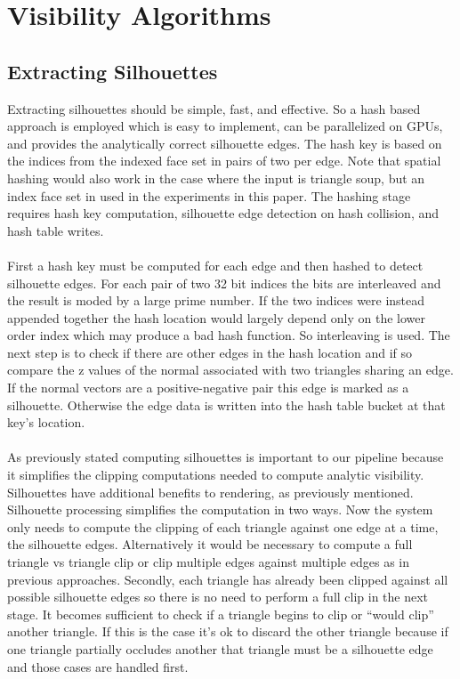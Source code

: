 \documentclass[review]{acmsiggraph}
\begin{document}
\section{Visibility Algorithms}
\subsection{Extracting Silhouettes}
Extracting silhouettes should be simple, fast, and effective. So a hash based approach is employed which is easy to implement, can be parallelized on GPUs, and provides the analytically correct silhouette edges. The hash key is based on the indices from the indexed face set in pairs of two per edge. Note that spatial hashing would also work in the case where the input is triangle soup, but an index face set in used in the experiments in this paper. The hashing stage requires hash key computation, silhouette edge detection on hash collision, and hash table writes.
\\\\
First a hash key must be computed for each edge and then hashed to detect silhouette edges. For each pair of two 32 bit indices the bits are interleaved and the result is moded by a large prime number. If the two indices were instead appended together the hash location would largely depend only on the lower order index which may produce a bad hash function. So interleaving is used. The next step is to check if there are other edges in the hash location and if so compare the z values of the normal associated with two triangles sharing an edge. If the normal vectors are a positive-negative pair this edge is marked as a silhouette. Otherwise the edge data is written into the hash table bucket at that key’s location. 
\\\\
As previously stated computing silhouettes is important to our pipeline because it simplifies the clipping computations needed to compute analytic visibility. Silhouettes have additional benefits to rendering, as previously mentioned. Silhouette processing simplifies the computation in two ways. Now the system only needs to compute the clipping of each triangle against one edge at a time, the silhouette edges. Alternatively it would be necessary to compute a full triangle vs triangle clip or clip multiple edges against multiple edges as in previous approaches. Secondly, each triangle has already been clipped against all possible silhouette edges so there is no need to perform a full clip in the next stage. It becomes sufficient to check if a triangle begins to clip or “would clip” another triangle. If this is the case it’s ok to discard the other triangle because if one triangle partially occludes another that triangle must be a silhouette edge and those cases are handled first.
\\\\
\end{document}
